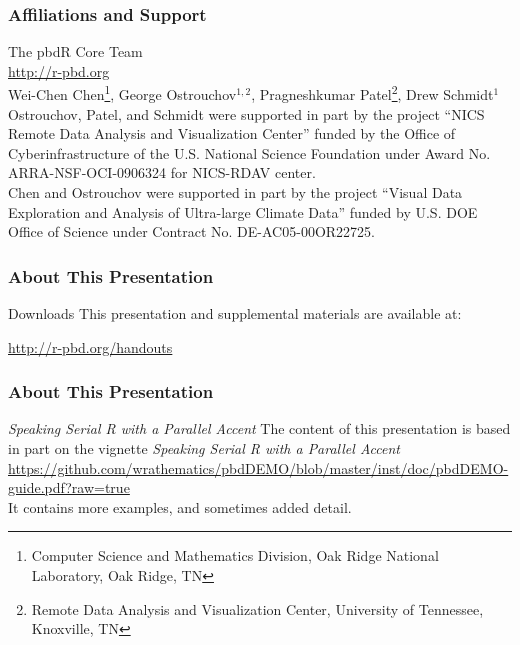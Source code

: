 \frame{
  \maketitle
}

\begin{frame}[noframenumbering]
\frametitle{Affiliations and Support}
{\small
The pbdR Core Team\\ \url{http://r-pbd.org}
\\[.4cm]
Wei-Chen Chen\footnote{\tiny{Computer Science and Mathematics Division, Oak Ridge National Laboratory, Oak Ridge, TN}}, 
George Ostrouchov$^{1,2}$, 
Pragneshkumar Patel\footnote{\tiny{Remote Data Analysis and Visualization Center, University of Tennessee, Knoxville, TN}}, 
Drew Schmidt$^1$
\\[.4cm]
Ostrouchov, Patel, and Schmidt were supported in part by the project
``NICS Remote Data Analysis and Visualization Center''
funded by the Office of Cyberinfrastructure of the
U.S. National Science Foundation
under Award No. ARRA-NSF-OCI-0906324 for NICS-RDAV center.\\[.4cm]
Chen and Ostrouchov were supported in part by the project
``Visual Data Exploration and Analysis of Ultra-large Climate Data''
funded by U.S. DOE Office of Science
under Contract No. DE-AC05-00OR22725.\\
}
\end{frame}

\begin{frame}
\frametitle{About This Presentation}
 \begin{block}{Downloads}
  This presentation and supplemental materials are available at:
  \begin{center}
  \url{http://r-pbd.org/handouts}
  \end{center}
 \end{block}
\end{frame}


\begin{frame}
\frametitle{About This Presentation}
 \begin{block}{\emph{Speaking Serial R with a Parallel Accent}}
  The content of this presentation is based in part on the  
vignette \emph{Speaking Serial R with a Parallel Accent}\\[.4cm]
  \url{https://github.com/wrathematics/pbdDEMO/blob/master/inst/doc/pbdDEMO-guide.pdf?raw=true}\\[.4cm]
  It contains more examples, and sometimes added detail.
 \end{block}
\end{frame}


